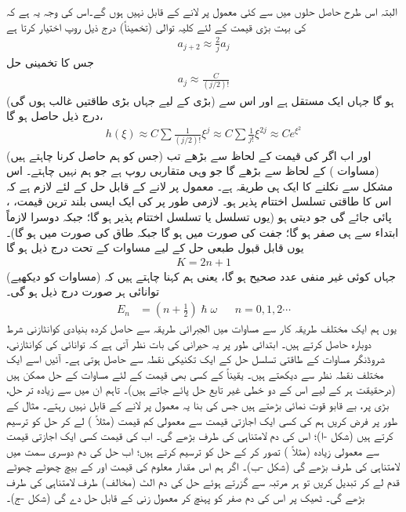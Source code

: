  البتہ اس طرح حاصل حلوں میں سے کئی معمول پر لانے کے قابل نہیں ہوں گے۔اس کی وجہ یہ ہے کہ  کی بہت بڑی قیمت کے لئے کلیہ توالی (تخمیناً) درج ذیل روپ اختیار کرتا ہے
\begin{align*}
a_{j+2}\approx\frac{2}{j}a_{j}
\end{align*}
جس کا تخمینی حل
\begin{align*}
a_{j}\approx\frac{C}{(j/2)!}
\end{align*}
ہو گا جہاں   ایک مستقل ہے اور اس سے (بڑی   کے لیے جہاں بڑی طاقتیں  غالب ہوں گی) درج ذیل حاصل ہو گا،
\begin{align*}
h(\xi)\approx C\sum\frac{1}{(j/2)!}\xi^{j}\approx C\sum\frac{1}{j!}\xi^{2j}\approx Ce^{\xi^{2}}
\end{align*}
اور اب اگر   کی  قیمت  کے لحاظ سے بڑھے تب  (جس کو ہم حاصل کرنا چاہتے ہیں) 
  (مساوات ) کے لحاظ سے بڑھے گا جو وہی متقاربی روپ ہے جو ہم نہیں چاہتے۔ اس مشکل سے نکلنے  کا ایک ہی طریقہ ہے۔ معمول پر لانے کے قابل حل کے لئے لازم ہے کہ اس کا طاقتی تسلسل اختتام پذیر ہو۔ لازمی طور پر   کی ایک ایسی بلند ترین قیمت، ،  پائی جائے گی جو  دیتی ہو (یوں   تسلسل یا   تسلسل اختتام پذیر  ہو گا؛ جبکہ  دوسرا لازماً ابتداء سے ہی صفر ہو گا؛ جفت  کی صورت میں  ہو گا جبکہ   طاق  کی صورت میں  ہو گا)۔  یوں قابل قبول طبعی حل کے لیے مساوات  کے تحت درج ذیل ہو گا
\begin{align*}
K=2n+1
\end{align*}
 جہاں  کوئی غیر منفی عدد صحیح ہو گا، یعنی ہم کہنا چاہتے ہیں کہ (مساوات  کو دیکھیے)  توانائی ہر صورت درج ذیل ہو گی۔
\begin{align}
E_{n}&=(n+\tfrac{1}{2} )\hslash\omega && n=0,1,2\cdots
\end{align}
یوں ہم  ایک  مختلف طریقہ کار سے مساوات  میں الجبرائی طریقہ سے حاصل کردہ بنیادی کوانٹازنی شرط دوبارہ حاصل کرتے ہیں۔ ابتدائی طور پر یہ حیرانی کی بات نظر آتی ہے کہ توانائی کی کوانٹازنی، شروڈنگر مساوات کے طاقتی تسلسل حل  کے ایک تکنیکی نقطہ سے حاصل ہوتی ہے۔ آئیں اسے ایک مختلف نقطہ نظر سے دیکھتے ہیں۔ یقیناً   کے کسی بھی قیمت کے لئے  مساوات  کے حل ممکن ہیں (درحقیقت ہر  کے لیے اس کے دو خطی  غیر تابع حل پائے جاتے ہیں)۔ تاہم ان میں سے زیادہ تر حل،  بڑی  پر، بے قابو قوت نمائی بڑھتے ہیں جس کی بنا یہ معمول پر لانے کے قابل نہیں رہتے۔ مثال کے طور پر فرض کریں ہم  کی کسی ایک اجازتی قیمت  سے معمولی کم   قیمت (مثلاً ) لے کر حل کو ترسیم کرتے ہیں (شکل -ا)؛ اس کی دم لامتناہی کی طرف بڑھے گی۔ اب  کی قیمت کسی ایک اجازتی قیمت سے معمولی زیادہ  (مثلاً  )  تصور کر کے حل کو  ترسیم کرتے ہیں؛ اب حل کی دم دوسری سمت میں لامتناہی کی طرف
 بڑھے گی (شکل -ب)۔  اگر  ہم اس مقدار معلوم کی قیمت  اور  کے بیچ چھوٹے  چھوٹے قدم لے کر تبدیل کریں تو ہر مرتبہ  سے گزرتے ہوئے  حل کی دم  الٹ (مخالف)  طرف لامتناہی کی طرف بڑھے گی۔ ٹھیک  پر اس کی دم صفر  کو پہنچ کر معمول زنی کے قابل حل دے گی (شکل -ج)۔

